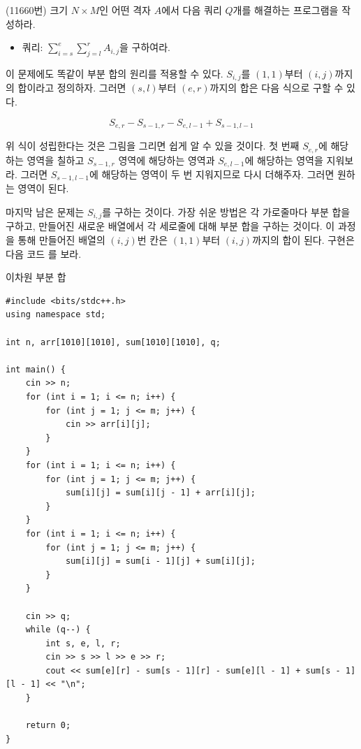 \begin{example}
    (11660번) 크기 $N \times M$인 어떤 격자 $A$에서 다음 쿼리 $Q$개를 해결하는 프로그램을 작성하라.
    \begin{itemize}
        \item 쿼리: $\sum_{i=s}^e \sum_{j=l}^r A_{i, j}$을 구하여라.
    \end{itemize}
\end{example}

이 문제에도 똑같이 부분 합의 원리를 적용할 수 있다. $S_{i, j}$를 $(1, 1)$부터 $(i, j)$까지의 합이라고 정의하자. 그러면 $(s, l)$부터 $(e, r)$까지의 합은 다음 식으로 구할 수 있다.

$$S_{e, r} - S_{s-1, r} - S_{e, l-1} + S_{s-1, l-1}$$

위 식이 성립한다는 것은 그림을 그리면 쉽게 알 수 있을 것이다. 첫 번째 $S_{e, r}$에 해당하는 영역을 칠하고 $S_{s-1, r}$ 영역에 해당하는 영역과 $S_{e, l-1}$에 해당하는 영역을 지워보라. 그러면 $S_{s-1, l-1}$에 해당하는 영역이 두 번 지워지므로 다시 더해주자. 그러면 원하는 영역이 된다.

마지막 남은 문제는 $S_{i, j}$를 구하는 것이다. 가장 쉬운 방법은 각 가로줄마다 부분 합을 구하고, 만들어진 새로운 배열에서 각 세로줄에 대해 부분 합을 구하는 것이다. 이 과정을 통해 만들어진 배열의 $(i, j)$번 칸은 $(1, 1)$부터 $(i, j)$까지의 합이 된다. 구현은 다음 코드 를 보라.

\begin{code} \label{code: 2d-prefix-sum}
이차원 부분 합
\begin{lstlisting}
#include <bits/stdc++.h>
using namespace std;

int n, arr[1010][1010], sum[1010][1010], q;

int main() {
    cin >> n;
    for (int i = 1; i <= n; i++) {
        for (int j = 1; j <= m; j++) {
            cin >> arr[i][j];
        }
    }
    for (int i = 1; i <= n; i++) {
        for (int j = 1; j <= m; j++) {
            sum[i][j] = sum[i][j - 1] + arr[i][j];
        }
    }
    for (int i = 1; i <= n; i++) {
        for (int j = 1; j <= m; j++) {
            sum[i][j] = sum[i - 1][j] + sum[i][j];
        }
    }

    cin >> q;
    while (q--) {
        int s, e, l, r;
        cin >> s >> l >> e >> r;
        cout << sum[e][r] - sum[s - 1][r] - sum[e][l - 1] + sum[s - 1][l - 1] << "\n";
    }

    return 0;
}
\end{lstlisting}
\end{code}

